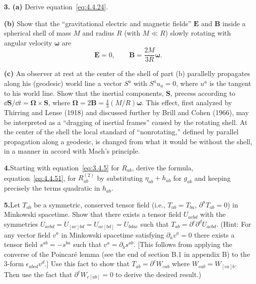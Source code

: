 \medskip
\noindent\textbf{3.}\label{prob:4.3}\quad
\textbf{(a)} Derive equation~\eqref{eq:4.4.24}.

\noindent\textbf{(b)} Show that the ``gravitational electric and magnetic fields''
\(\mathbf{E}\) and \(\mathbf{B}\) inside a spherical shell of mass \(M\) and radius \(R\)
(with \(M\ll R\)) slowly rotating with angular velocity \(\boldsymbol{\omega}\) are
\begin{equation*}
  \mathbf{E}=0 ,\qquad \mathbf{B}=\frac{2M}{3R}\boldsymbol{\omega} .
\end{equation*}

\noindent\textbf{(c)} An observer at rest at the center of the shell of part (b)
parallelly propagates along his (geodesic) world line a vector \(S^a\) with
\(S^au_a=0\), where \(u^a\) is the tangent to his world line. Show that the inertial
components, \(\mathbf{S}\), precess according to
\(\dd\mathbf{S}/\dd t=\boldsymbol{\Omega}\mathbin{\times}\mathbf{S}\), where
\(\boldsymbol{\Omega}=2\mathbf{B}=\tfrac43(M/R)\boldsymbol{\omega}\). This effect, first analyzed by
Thirring and Lense (1918) and discussed further by Brill and Cohen (1966), may be
interpreted as a ``dragging of inertial frames'' caused by the rotating shell. At the
center of the shell the local standard of ``nonrotating,'' defined by parallel
propagation along a geodesic, is changed from what it would be without the shell, in
a manner in accord with Mach's principle.

\medskip
\noindent\textbf{4.}\label{prob:4.4}\quad Starting with
equation~\eqref{eq:3.4.5} for \(R_{ab}\), derive the formula,
equation~\eqref{eq:4.4.51}, for \(R^{(2)}_{ab}\) by substituting
\(\eta_{ab}+h_{ab}\) for \(g_{ab}\) and keeping precisely the terms quadratic in
\(h_{ab}\).

\medskip
\noindent\textbf{5.}\label{prob:4.5}\quad Let \(T_{ab}\) be a symmetric,
conserved tensor field (i.e., \(T_{ab}=T_{ba}\), \(\partial^aT_{ab}=0\)) in
Minkowski spacetime. Show that there exists a tensor field \(U_{acbd}\) with the
symmetries \(U_{acbd}=U_{[ac]bd}=U_{ac[bd]}=U_{bdac}\) such that
\(T_{ab}=\partial^c\partial^dU_{acbd}\). (Hint: For any vector field \(v^a\) in
Minkowski spacetime satisfying \(\partial_av^a=0\) there exists a tensor field
\(s^{ab}=-s^{ba}\) such that \(v^a=\partial_bs^{ab}\). [This follows from applying
the converse of the Poincar\'e lemma (see the end of section B.1 in appendix B) to
the 3-form \(\epsilon_{abcd}v^d\).] Use this fact to show that
\(T_{ab}=\partial^cW_{cab}\) where \(W_{cab}=W_{[ca]b}\). Then use the fact that
\(\partial^cW_{c[ab]}=0\) to derive the desired result.)

